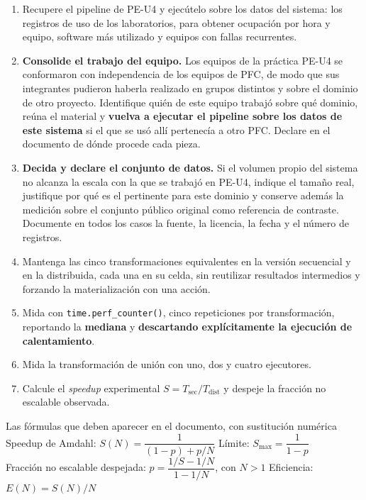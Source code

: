 \documentclass[11pt,a4paper]{article}
\begin{document}
	\begin{enumerate}[leftmargin=*,itemsep=4pt]
		\item Recupere el pipeline de PE-U4 y ejecútelo sobre los datos del sistema: los registros de uso de los laboratorios, para obtener ocupación por hora y equipo, software más utilizado y equipos con fallas recurrentes.
		\item \textbf{Consolide el trabajo del equipo.} Los equipos de la práctica PE-U4 se conformaron con independencia de los equipos de PFC, de modo que sus integrantes pudieron haberla realizado en grupos distintos y sobre el dominio de otro proyecto. Identifique quién de este equipo trabajó sobre qué dominio, reúna el material y \textbf{vuelva a ejecutar el pipeline sobre los datos de este sistema} si el que se usó allí pertenecía a otro PFC. Declare en el documento de dónde procede cada pieza.
		\item \textbf{Decida y declare el conjunto de datos.} Si el volumen propio del sistema no alcanza la escala con la que se trabajó en PE-U4, indique el tamaño real, justifique por qué es el pertinente para este dominio y conserve además la medición sobre el conjunto público original como referencia de contraste. Documente en todos los casos la fuente, la licencia, la fecha y el número de registros.
		\item Mantenga las cinco transformaciones equivalentes en la versión secuencial y en la distribuida, cada una en su celda, sin reutilizar resultados intermedios y forzando la materialización con una acción.
		\item Mida con \texttt{time.perf\_counter()}, cinco repeticiones por transformación, reportando la \textbf{mediana} y \textbf{descartando explícitamente la ejecución de calentamiento}.
		\item Mida la transformación de unión con uno, dos y cuatro ejecutores.
		\item Calcule el \emph{speedup} experimental $S = T_{\text{sec}} / T_{\text{dist}}$ y despeje la fracción no escalable observada.
	\end{enumerate}
	
	\begin{defBox}{Las fórmulas que deben aparecer en el documento, con sustitución numérica}
		Speedup de Amdahl: $S(N) = \dfrac{1}{(1-p) + p/N}$ \qquad Límite: $S_{\max} = \dfrac{1}{1-p}$\\[4pt]
		Fracción no escalable despejada: $p = \dfrac{1/S - 1/N}{1 - 1/N}$, con $N>1$ \qquad Eficiencia: $E(N) = S(N)/N$
	\end{defBox}
	
\end{document}
